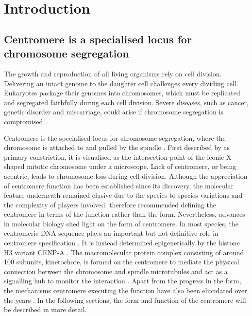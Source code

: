 \chapter{Introduction}
\section{Centromere is a specialised locus for chromosome segregation}

 The growth and reproduction of all living organisms rely on cell division. Delivering an intact genome to the daughter cell challenges every dividing cell. Eukaryotes package their genomes into chromosomes, which must be replicated and segregated faithfully during each cell division. Severe diseases, such as cancer, genetic disorder and miscarriage, could arise if chromosome segregation is compromised \citep{Jallepalli2001ChromosomeMystery, Draviam2004ChromosomeStability, Wasielak-Politowska2022ChromosomeAging, Losada2014CohesinBeyond}. 
 
 Centromere is the specialised locus for chromosome segregation, where the chromosome is attached to and pulled by the spindle \citep{Westhorpe2015AMaintenance, McKinley2015TheFunction, Talbert2020WhatCentromere, Fukagawa2014}. First described by \cite{Flemming1882ZellsubstanzZelltheilung} as primary constriction, it is visualised as the intersection point of the iconic X-shaped mitotic chromosome under a microscope. Lack of centromere, or being acentric, leads to chromosome loss during cell division. Although the appreciation of centromere function has been established since its discovery, the molecular feature underneath remained elusive due to the species-to-species variations and the complexity of players involved. \cite{Darlington1936TheEnquiry} therefore recommended defining the centromere in terms of the function rather than the form. Nevertheless, advances in molecular biology shed light on the form of centromere. In most species, the centromeric DNA sequence plays an important but not definitive role in centromere specification \citep{Hoffmann2020, Harrington1997FormationMicrochromosomes, Catania2015SequenceChromatin, Iwata-Otsubo2017, Kasinathan2018Non-B-FormCentromeres, Shukla2018CentromereCycle, Logsdon2019, Murillo-Pineda2020}. It is instead determined epigenetically by the histone H3 variant CENP-A \citep{Warburton1997ImmunolocalizationCentromeres, Vafa1997ChromatinPlate, Earnshaw1985ThreeChromosome, Liu2006MappingCells, Regnier2005CENP-ABubR1, Heun2006, Mendiburo2011, Barnhart2011, Logsdon2015}. The macromolecular protein complex consisting of around 100 subunits, kinetochore, is formed on the centromere to mediate the physical connection between the chromosome and spindle microtubules and act as a signalling hub to monitor the interaction \citep{Musacchio2017AFunction, McAinsh2022TheKinetochores, Cheeseman2014TheKinetochore, Hara2018KinetochoreExit}. Apart from the progress in the form, the mechanisms centromere executing the function have also been elucidated over the years \citep{Tanaka2013, Zhou2020EmergentChromosomes}. In the following sections, the form and function of the centromere will be described in more detail. 

